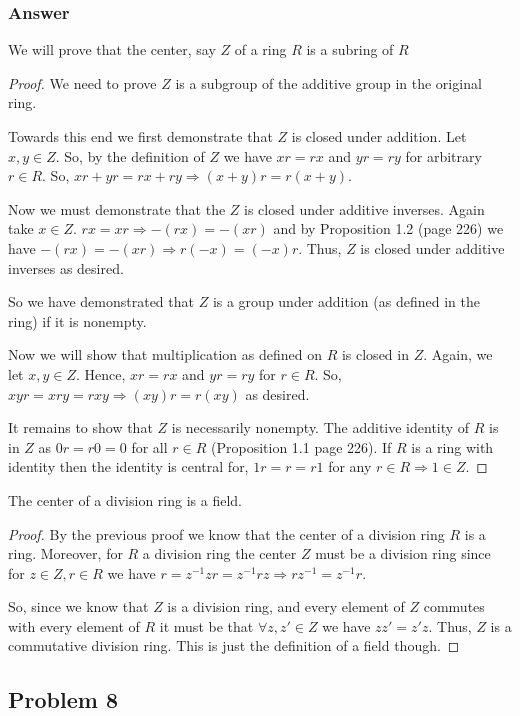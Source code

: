 \documentclass[12pt]{article}
\begin{document}
\subsubsection{Answer}
We will prove that the center, say $Z$ of a ring $R$ is a subring of $R$ 
\begin{proof}We need to prove  $Z$ is a subgroup of the additive group in the original ring.

Towards this end we first demonstrate that $Z$ is closed under addition. Let $x, y \in Z$. So, by the definition of $Z$ we have $x r = r x$ and $y r = r y$ for arbitrary $r \in R$. So, $x r + y r = r x + r y \Rightarrow (x+y) r= r (x+y)$.

Now we must demonstrate that the $Z$ is closed under additive inverses. Again take $x \in Z$. $r x = x r \Rightarrow -(r x) = -(x r)$ and by Proposition 1.2 (page 226) we have $-(r x) = -(x r) \Rightarrow r (-x) = (-x) r$. Thus, $Z$ is closed under additive inverses as desired. 

So we have demonstrated that $Z$ is a group under addition (as defined in the ring) if it is nonempty. 

Now we will show that multiplication as defined on $R$ is closed in $Z$. Again, we let $x, y \in Z$. Hence, $x r = r x$ and $ y r = r y$ for $r \in R$. So, $x y r = x r y = r x y  \Rightarrow (x y) r = r (x y)$ as desired.

It remains to show that $Z$ is necessarily nonempty. The additive identity of $R$ is in $Z$ as $0r = r0 = 0$ for all $r\in R$ (Proposition 1.1 page 226). If $R$ is a ring with identity then the identity is central for, $1 r = r = r 1$ for any $r \in R \Rightarrow 1\in Z$. \end{proof}

The center of a division ring is a field.
\begin{proof} By the previous proof we know that the center of a division ring $R$ is a ring. Moreover, for $R$ a division ring the center $Z$ must be a division ring since for $z\in Z, r \in R$ we have $r = z^{-1}z r = z^{-1} r z \Rightarrow r z^{-1}= z^{-1} r $.

So, since we know that $Z$ is a division ring, and every element of $Z$ commutes with every element of $R$ it must be that $\forall z,z'\in Z $ we have $z z'=z'z$. Thus, $Z$ is a commutative division ring. This is just the definition of a field though.\end{proof}

\subsection{Problem 8}
\end{document}
